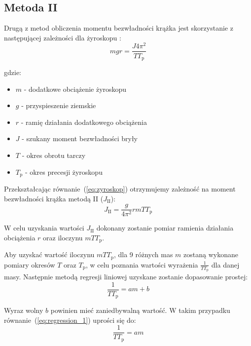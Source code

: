 \documentclass[twocolumn, a4paper, polish, 10pt]{article}
\begin{document}
\subsection{Metoda II}
Drugą z metod obliczenia momentu bezwładności krążka jest skorzystanie z następującej zależności dla żyroskopu \cite{pracownia_fizyczna_m8}:
\begin{equation}
    mgr = \frac{ J 4 \pi^2 }{T T_{\mathrm{p}}}
\label{eq:zyroskop}
\end{equation}

gdzie:
\begin{itemize}[nosep]
  \item $m$ - dodatkowe obciążenie żyroskopu
  \item $g$ - przyspieszenie ziemskie
  \item $r$ - ramię działania dodatkowego obciążenia
  \item $J$ - szukany moment bezwładności bryły
  \item $T$ - okres obrotu tarczy
  \item $T_{\mathrm{p}}$ - okres precesji żyroskopu
\end{itemize}

Przekształcając równanie~(\ref{eq:zyroskop}) otrzymujemy zależność na moment bezwładności krążka metodą II ($J_{\mathrm{II}}$):
\begin{equation}
    J_{\mathrm{II}} = \frac{g}{4 \pi^2} r m T T_{\mathrm{p}}
\label{eq:moment_bezwladnosci_zyroskop}
\end{equation}

W celu uzyskania wartości $J_{\mathrm{II}}$ dokonany zostanie pomiar ramienia działania obciążenia $r$ oraz iloczynu $m T T_{\mathrm{p}}$.

Aby uzyskać wartość iloczynu $m T T_{\mathrm{p}}$, dla 9 różnych mas $m$ zostaną wykonane pomiary okresów $T$ oraz $T_{\mathrm{p}}$, w celu poznania wartości wyrażenia $\frac{1}{T T_{\mathrm{p}}}$ dla danej masy. Następnie metodą regresji liniowej uzyskane zostanie dopasowanie prostej:
\begin{equation}
    \frac{1}{T T_{\mathrm{p}}} = a m + b
\label{eq:regression_1}
\end{equation}

Wyraz wolny $b$ powinien mieć zaniedbywalną wartość. W takim przypadku równanie~(\ref{eq:regression_1}) uprości się do:
\begin{displaymath}
    \frac{1}{T T_{\mathrm{p}}} = a m
\end{displaymath}
\end{document}
